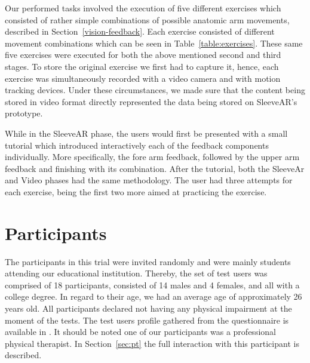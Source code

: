 Our performed tasks involved the execution of five different exercises which consisted of rather simple combinations of possible anatomic arm movements, described in Section~\ref{vision-feedback}.
Each exercise consisted of different movement combinations which can be seen in Table~\ref{table:exercises}.
These same five exercises were executed for both the above mentioned second and third stages.
To store the original exercise we first had to capture it, hence, each exercise was simultaneously recorded with a video camera and with motion tracking devices. Under these circumstances, we made sure that the content being stored in video format directly represented the data being stored on SleeveAR's prototype.

While in the SleeveAR phase, the users would first be presented with a small tutorial which introduced interactively each of the feedback components individually. 
More specifically, the fore arm feedback, followed by the upper arm feedback and finishing with its combination.
After the tutorial, both the SleeveAr and Video phases had the same methodology. 
The user had three attempts for each exercise, being the first two more aimed at practicing the exercise.

\begin{table}[!t]
\centering
{}
\caption{Arm movements in exercises.}
\label{table:exercises}
\end{table}


\section{Participants} 


The participants in this trial were invited randomly and were mainly students attending our educational
institution. Thereby, the set of test users was comprised of 18 participants, consisted of 14 males and 4 females,
and all with a college degree. In regard to their age, we had an average age of approximately 26 years old. 
All participants declared not having any physical impairment at the moment of the tests. 
The test users profile gathered from the questionnaire is available in .
It should be noted one of our participants was a professional physical therapist. 
In Section~\ref{sec:pt} the full interaction with this participant is described.



